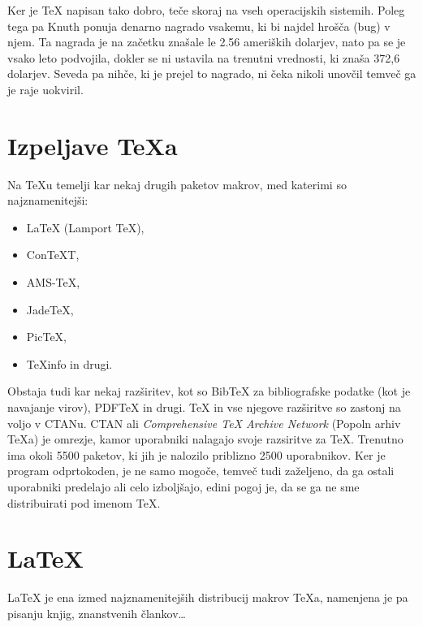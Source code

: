 \documentclass[10p, a4paper, twopage]{book}
\begin{document}
Ker je \TeX{} napisan tako dobro, teče skoraj na vseh operacijskih sistemih. Poleg tega pa Knuth ponuja denarno nagrado vsakemu, ki bi najdel hrošča (bug) v njem. Ta nagrada je na začetku znašale le 2.56 ameriških dolarjev, nato pa se je vsako leto podvojila, dokler se ni ustavila na trenutni vrednosti, ki znaša 372,6 dolarjev. Seveda pa nihče, ki je prejel to nagrado, ni čeka nikoli unovčil temveč ga je raje uokviril.


\chapter{Izpeljave \TeX{}a}
Na \TeX{}u temelji kar nekaj drugih paketov makrov, med katerimi so najznamenitejši:
\begin{itemize}
\item \LaTeX{} (Lamport \TeX{}),
\item Con\TeX{}T,
\item AMS-\TeX{},
\item Jade\TeX{},
\item Pic\TeX{},
\item \TeX{}info in drugi.
\end{itemize}

Obstaja tudi kar nekaj razširitev, kot so Bib\TeX{} za bibliografske podatke (kot je navajanje virov), PDF\TeX{} in drugi.
\TeX{} in vse njegove razširitve so zastonj na voljo v CTANu. CTAN ali \textit{Comprehensive \TeX{} Archive Network} (Popoln arhiv \TeX{}a) je omrezje, kamor uporabniki nalagajo svoje razsiritve za \TeX{}. Trenutno ima okoli 5500 paketov, ki jih je nalozilo priblizno 2500 uporabnikov.
Ker je program odprtokoden, je ne samo mogoče, temveč tudi zaželjeno, da ga ostali uporabniki predelajo ali celo izboljšajo, edini pogoj je, da se ga ne sme distribuirati pod imenom \TeX{}.


\chapter{\LaTeX{}}
\LaTeX{} je ena izmed najznamenitejših distribucij makrov \TeX{}a, namenjena je pa pisanju knjig, znanstvenih člankov\ldots

\end{document}
